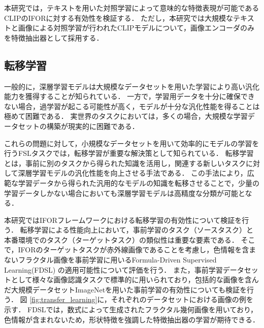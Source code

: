 \documentclass[a4paper,11pt,nomag]{jsreport}
\begin{document}
本研究では，テキストを用いた対照学習によって意味的な特徴表現が可能であるCLIPのIFORに対する有効性を検証する．
ただし，本研究では大規模なテキストと画像による対照学習が行われたCLIPモデルについて，画像エンコーダのみを特徴抽出器として採用する．

\subsection{転移学習}

一般的に，深層学習モデルは大規模なデータセットを用いた学習により高い汎化能力を獲得することが知られている．
一方で，学習用データを十分に確保できない場合，過学習が起こる可能性が高く，モデルが十分な汎化性能を得ることは極めて困難である．
実世界のタスクにおいては，多くの場合，大規模な学習データセットの構築が現実的に困難である．

これらの問題に対して，小規模なデータセットを用いて効率的にモデルの学習を行うFSLタスクでは，転移学習が重要な解決策として知られている．
転移学習とは，事前に別のタスクから得られた知識を活用し，関連する新しいタスクに対して深層学習モデルの汎化性能を向上させる手法である．
この手法により，広範な学習データから得られた汎用的なモデルの知識を転移させることで，少量の学習データしかない場合においても深層学習モデルは高精度な分類が可能となる．

本研究ではIFORフレームワークにおける転移学習の有効性について検証を行う．
転移学習による性能向上において，事前学習のタスク（ソースタスク）と本番環境でのタスク（ターゲットタスク）の類似性は重要な要素である．
そこで，IFORのターゲットタスクが赤外線画像であることを考慮し，色情報を含まないフラクタル画像を事前学習に用いるFormula-Driven Supervised Learning(FDSL) \cite{fdsl}の適用可能性について評価を行う．
また，事前学習データセットとして様々な画像認識タスクで標準的に用いられており，包括的な画像を含んだ大規模データセットImageNetを用いた事前学習の有効性についても検証を行う．
図 \ref{fig:transfer_learning}に，それぞれのデータセットにおける画像の例を示す．
FDSLでは，数式によって生成されたフラクタル幾何画像を用いており，色情報が含まれないため，形状特徴を強調した特徴抽出器の学習が期待できる．
\end{document}
